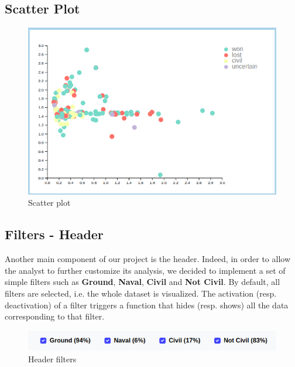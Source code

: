 \subsection{Scatter Plot}
\begin{figure}[h]
\centering
\includegraphics[scale=0.30]{./images/scatter_plot.png}
\caption{Scatter plot}
\end{figure}

\subsection{Filters - Header}
Another main component of our project is the header. Indeed, in order to allow the analyst to further customize its analysis, we decided to implement a set of simple filters such as \textbf{Ground}, \textbf{Naval}, \textbf{Civil} and \textbf{Not Civil}. By default, all filters are selected, i.e. the whole dataset is visualized. The activation (resp. deactivation) of a filter triggers a function that hides (resp. shows) all the data corresponding to that filter.
\begin{figure}[h]
\centering
\includegraphics[scale=0.32]{./images/header_filters.png}
\caption{Header filters}
\end{figure}

